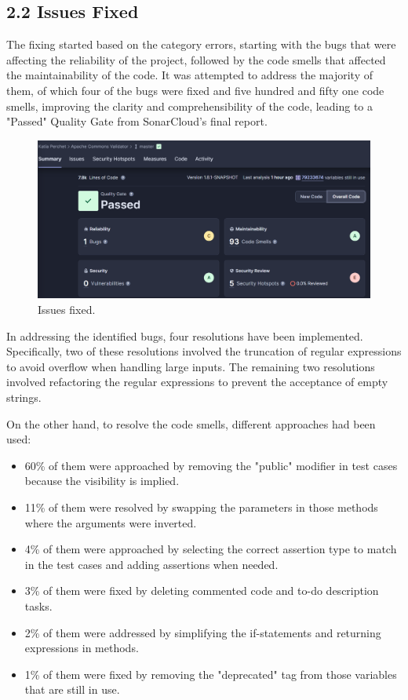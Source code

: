 \documentclass{sigchi}
\begin{document}
\subsection{2.2 Issues Fixed}
The fixing started based on the category errors, starting with the bugs that were affecting the reliability of the project, followed by the code smells that affected the maintainability of the code. It was attempted to address the majority of them, of which four of the bugs were fixed and five hundred and fifty one code smells, improving the clarity and comprehensibility of the code, leading to a "Passed" Quality Gate from SonarCloud's final report. 
\begin{figure}[h!]
    \centering
    \includegraphics[width=1\columnwidth]{finalSonarCloud.png}
    \caption{Issues fixed.}
    \label{fig:enter-label}
\end{figure}

In addressing the identified bugs, four resolutions have been implemented. Specifically, two of these resolutions involved the truncation of regular expressions to avoid overflow when handling large inputs. The remaining two resolutions involved refactoring the regular expressions to prevent the acceptance of empty strings. 

On the other hand, to resolve the code smells, different approaches had been used:
\begin{itemize}
    \item 60\% of them were approached by removing the "public" modifier in test cases because the visibility is implied.
    \item 11\% of them were resolved by swapping the parameters in those methods where the arguments were inverted. 
    \item 4\% of them were approached by selecting the correct assertion type to match in the test cases and adding assertions when needed.
    \item 3\% of them were fixed by deleting commented code and to-do description tasks. 
    \item 2\% of them were addressed by simplifying the if-statements and returning expressions in methods. 
    \item 1\% of them were fixed by removing the "deprecated" tag from those variables that are still in use.
\end{itemize}
\end{document}

